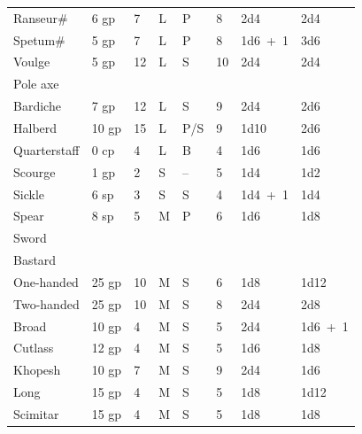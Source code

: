 \begin{minipage}{\textwidth}
\begin{tabular}{|p{}|p{}|p{}|p{}|p{}|p{}|p{}|p{}|}
\rowcolor[gray]{.9}\hspace{1em}Ranseur\#			& 6 gp	& 7		& L	& P		& 8		& 2d4	& 2d4 \\
\hspace{1em}Spetum\#			& 5 gp	& 7		& L	& P		& 8		& 1d6~+~1	& 3d6 \\
\rowcolor[gray]{.9}\hspace{1em}Voulge			& 5 gp	& 12	& L	& S		& 10	& 2d4	& 2d4 \\
Pole axe			& & 	& 		& 	& 	& 	& \\
\hspace{1em}Bardiche			& 7 gp	& 12	& L	& S		& 9		& 2d4	& 2d6 \\
\rowcolor[gray]{.9}\hspace{1em}Halberd			& 10 gp	& 15	& L	& P/S	& 9		& 1d10	& 2d6 \\
Quarterstaff		& 0 cp	& 4		& L	& B		& 4		& 1d6	& 1d6 \\
\rowcolor[gray]{.9}Scourge				& 1 gp	& 2		& S	& --	& 5		& 1d4	& 1d2 \\
Sickle				& 6 sp	& 3		& S	& S		& 4		& 1d4~+~1	& 1d4 \\
\rowcolor[gray]{.9}Spear				& 8 sp	& 5		& M	& P		& 6		& 1d6	& 1d8 \\
Sword				& 	& 	& 	& 	& 	& 	& \\
\hspace{1em}Bastard			& 	& 	& 	& 	& 	& 	& \\
\hspace{1em}\hspace{1em}One-handed	& 25 gp	& 10	& M	& S		& 6		& 1d8	& 1d12 \\
\rowcolor[gray]{.9}\hspace{1em}\hspace{1em}Two-handed	& 25 gp	& 10	& M	& S		& 8		& 2d4	& 2d8 \\
\hspace{1em}Broad				& 10 gp	& 4		& M	& S		& 5		& 2d4	& 1d6~+~1 \\
\rowcolor[gray]{.9}\hspace{1em}Cutlass			& 12 gp	& 4		& M	& S		& 5		& 1d6	& 1d8 \\
\hspace{1em}Khopesh			& 10 gp	& 7		& M	& S		& 9		& 2d4	& 1d6 \\
\rowcolor[gray]{.9}\hspace{1em}Long				& 15 gp	& 4		& M	& S		& 5		& 1d8	& 1d12 \\
\hspace{1em}Scimitar			& 15 gp	& 4		& M	& S		& 5		& 1d8	& 1d8 \\

\end{tabular}
\end{minipage}
